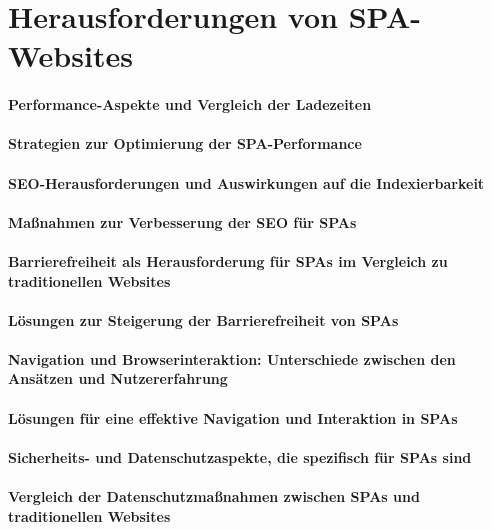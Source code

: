 \section{Herausforderungen von SPA-Websites}
\paragraph*{Performance-Aspekte und Vergleich der Ladezeiten}
\paragraph*{Strategien zur Optimierung der SPA-Performance}
\paragraph*{SEO-Herausforderungen und Auswirkungen auf die Indexierbarkeit}
\paragraph*{Maßnahmen zur Verbesserung der SEO für SPAs}
\paragraph*{Barrierefreiheit als Herausforderung für SPAs im Vergleich zu traditionellen Websites}
\paragraph*{Lösungen zur Steigerung der Barrierefreiheit von SPAs}
\paragraph*{Navigation und Browserinteraktion: Unterschiede zwischen den Ansätzen und Nutzererfahrung}
\paragraph*{Lösungen für eine effektive Navigation und Interaktion in SPAs}
\paragraph*{Sicherheits- und Datenschutzaspekte, die spezifisch für SPAs sind}
\paragraph*{Vergleich der Datenschutzmaßnahmen zwischen SPAs und traditionellen Websites}
